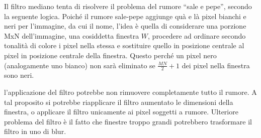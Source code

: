 \documentclass{subfiles}
\begin{document}
Il filtro mediano tenta di risolvere il problema del rumore ``sale e pepe'', secondo la seguente logica.
Poiché il rumore sale-pepe aggiunge quà e là pixel bianchi e neri per l'immagine, da cui il nome,
l'idea è quella di considerare una porzione MxN dell'immagine, una cosiddetta finestra \(W\),
procedere ad ordinare secondo tonalità di colore i pixel nella stessa e sostituire quello in posizione centrale al pixel in posizione centrale della finestra.
Questo perché un pixel nero (analogamente uno bianco) non sarà eliminato se \(\tfrac{MN}{2} + 1\) dei pixel nella finestra sono neri.


\begin{Remark*}
    l'applicazione del filtro potrebbe non rimuovere completamente tutto il rumore.
    A tal proposito si potrebbe riapplicare il filtro aumentato le dimensioni della finestra, o applicare il filtro unicamente ai pixel soggetti a rumore.
    Ulteriore problema del filtro è il fatto che finestre troppo grandi potrebbero trasformare il filtro in uno di blur.
\end{Remark*}
\end{document}
